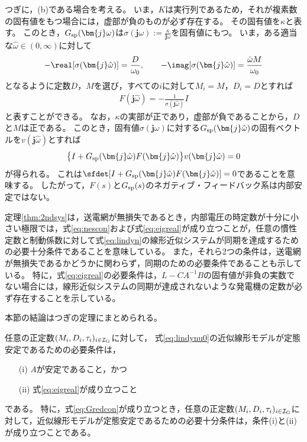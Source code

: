 \documentclass[tombow,dvipdfmx]{corona-a5}
\begin{document}
\begin{証明}
つぎに，(b)である場合を考える。
いま，$K$は実行列であるため，それが複素数の固有値をもつ場合には，虚部が負のものが必ず存在する。
その固有値を$\kappa$と表す。
このとき，$G_{\rm sp}(\bm{j} \omega)$は$\sigma (\bm{j} \omega):= \frac{\kappa}{\bm{j} \omega}$を固有値にもつ。
いま，ある適当な$\hat{\omega}\in (0,\infty)$に対して
\begin{align}\label{eq:Fspara}
-\real[\sigma(\bm{j} \hat{\omega})]  = \frac{D}{\omega_0}
,\qquad
-\imag[\sigma(\bm{j} \hat{\omega})]  = \frac{\hat{\omega} M}{\omega_0}
\end{align}
となるように定数$D$，$M$を選び，すべての$i$に対して$M_i=M$，$D_i=D$とすれば
\begin{align*}
F(\bm{j} \hat{\omega}) = - \frac{1}{ \sigma(\bm{j} \hat{\omega}) } I
\end{align*}
と表すことができる。
なお，$\kappa$の実部が正であり，虚部が負であることから，$D$と$M$は正である。
このとき，固有値$\sigma (\bm{j} \omega)$に対する$G_{\rm sp}(\bm{j} \hat{\omega})$の固有ベクトルを$v(\bm{j} \hat{\omega})$とすれば
\begin{align*}
\bigl\{ I+G_{\rm sp}(\bm{j} \hat{\omega})F(\bm{j} \hat{\omega})\bigr\}
v(\bm{j} \hat{\omega})
=0
\end{align*}
が得られる。
これは$\sfdet [I+G_{\rm sp}(\bm{j} \hat{\omega}) F(\bm{j} \hat{\omega})]=0$であることを意味する。
したがって，$F(s)$と$G_{\rm sp}(s)$のネガティブ・フィードバック系は内部安定ではない。
\end{証明}


定理\ref{thm:2ndsys}は，送電網が無損失であるとき，内部電圧の時定数が十分に小さい極限では，式\ref{eq:nescon}および式\ref{eq:eigreal}が成り立つことが，任意の慣性定数と制動係数に対して式\ref{eq:lindyn}の線形近似システムが同期を達成するための必要十分条件であることを意味している。
また，それら2つの条件は，送電網が無損失であるかどうかに関わらず，同期のための必要条件であることも示している。
特に，式\ref{eq:eigreal}の必要条件は，$L-CA^{-1}B$の固有値が非負の実数でない場合には，線形近似システムの同期が達成されないような発電機の定数が必ず存在することを示している。




本節の結論はつぎの定理にまとめられる。


\begin{定理}[近似線形モデルの定態安定性条件]\label{thm:sync}
任意の正定数$(M_i,D_i,\tau_i)_{i \in \mathcal{I}_{\rm G}}$に対して，
式\ref{eq:lindynu0}の近似線形モデルが定態安定であるための必要条件は，
\begin{itemize}
\item[(i)] $A$が安定であること，かつ
\item[(ii)] 式\ref{eq:eigreal}が成り立つこと
\end{itemize}
である。
特に，式\ref{eq:Gredcon}が成り立つとき，任意の正定数$(M_i,D_i,\tau_i)_{i \in \mathcal{I}_{\rm G}}$に対して，近似線形モデルが定態安定であるための必要十分条件は，条件(i)と(ii)が成り立つことである。
\end{定理}
\end{document}
